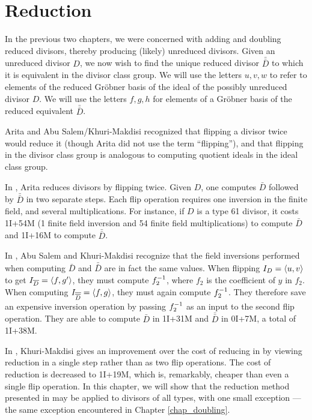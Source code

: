 
\section{Reduction}
\label{chap_reduction}

In the previous two chapters, we were concerned with adding and doubling reduced divisors,
thereby producing (likely) unreduced divisors.
Given an unreduced divisor $D$, we now wish to find the unique reduced divisor $\bar{\bar D}$ to which 
it is equivalent in the divisor class group.
We will use the letters $u,v,w$ to refer to elements of the reduced Gr\"obner basis
of the ideal of the possibly unreduced divisor $D$.
We will use the letters $f,g,h$ for elements of a Gr\"obner basis of the reduced equivalent $\bar{\bar D}$.

Arita and Abu Salem/Khuri-Makdisi recognized that
flipping a divisor twice would reduce it (though Arita did not use the term ``flipping''),
and that flipping in the divisor class group is analogous to computing quotient ideals in the ideal class group.

In \cite{arita05-2}, Arita reduces divisors by flipping twice.
Given $D$, one computes $\bar D$ followed by $\bar{\bar D}$ in two separate steps.
Each flip operation requires one inversion in the finite field, and several multiplications.
For instance, if $D$ is a type 61 divisor,
it costs 1I+54M (1 finite field inversion and 54 finite field multiplications)
to compute $\bar D$ and 1I+16M to compute $\bar{\bar D}$.

In \cite{salem07}, Abu Salem and Khuri-Makdisi recognize that the field inversions performed
when computing $\bar D$ and $\bar{\bar D}$ are in fact the same values.
When flipping $I_D = \left\langle u,v \right\rangle$ to get $I_{\overline D} = \left\langle f,g' \right\rangle$, they must compute $f_2^{-1}$,
where $f_2$ is the coefficient of $y$ in $f_2$.
When computing $I_{\overline{\overline D}} = \left\langle f,g \right\rangle$, they must again compute $f_2^{-1}$.
They therefore save an expensive inversion operation by passing $f_2^{-1}$ as an input to the second flip operation.
They are able to compute $\bar D$ in 1I+31M and $\bar{\bar D}$ in 0I+7M, a total of 1I+38M.

In \cite{kmakdisi18}, Khuri-Makdisi gives an improvement over the cost of reducing in \cite{salem07}
by viewing reduction in a single step rather than as two flip operations.
The cost of reduction is decreased to 1I+19M, which is, remarkably, cheaper than even a single flip operation.
In this chapter, we will show that the reduction method presented in \cite{kmakdisi18}
may be applied to divisors of all types, with one small exception ---
the same exception encountered in Chapter \ref{chap_doubling}.

